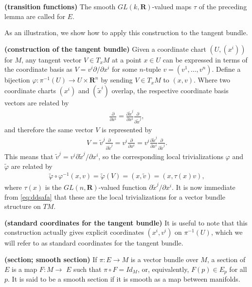 \documentclass[12pt]{article} %
\newcommand{\bfs}[1]{\textbf{({#1}) }}
\begin{document}
\begin{defa}\bfs{transition functions}
The smooth $G L(k, \mathbf{R})$-valued maps $\tau$ of the preceding lemma are called  for $E$.
\end{defa}
As an illustration, we show how to apply this construction to the tangent bundle.
\begin{cora}\bfs{construction of the tangent bundle}\label{cor:dhfdaafd}
 Given a coordinate chart $\left(U,\left(x^{i}\right)\right)$ for $M$, any tangent vector $V \in T_{x} M$ at a point $x \in U$ can be expressed in terms of the coordinate basis as $V=v^{i} \partial / \partial x^{i}$ for some $n$-tuple $v=\left(v^{1}, \ldots, v^{n}\right)$. Define a bijection $\varphi: \pi^{-1}(U) \rightarrow U \times \mathbf{R}^{n}$ by sending $V \in T_{x} M$ to $(x, v)$. Where two coordinate charts $\left(x^{i}\right)$ and $\left(\tilde{x}^{i}\right)$ overlap, the respective coordinate basis vectors are related by
\begin{align*}
\frac{\partial}{\partial x^{i}}=\frac{\partial \tilde{x}^{j}}{\partial x^{i}} \frac{\partial}{\partial \tilde{x}^{j}},
\end{align*}
and therefore the same vector $V$ is represented by
\begin{align*}
V=\tilde{v}^{j} \frac{\partial}{\partial \tilde{x}^{j}}=v^{i} \frac{\partial}{\partial x^{i}}=v^{i} \frac{\partial \tilde{x}^{j}}{\partial x^{i}} \frac{\partial}{\partial \tilde{x}^{j}} .
\end{align*}
This means that $\tilde{v}^{j}=v^{i} \partial \tilde{x}^{j} / \partial x^{i}$, so the corresponding local trivializations $\varphi$ and $\tilde{\varphi}$ are related by
\begin{align*}
\widetilde{\varphi} \circ \varphi^{-1}(x, v)=\widetilde{\varphi}(V)=(x, \tilde{v})=(x, \tau(x) v),
\end{align*}
where $\tau(x)$ is the $G L(n, \mathbf{R})$-valued function $\partial \tilde{x}^{j} / \partial x^{i}$. It is now immediate from \cref{eq:ddsafa} that these are the local trivializations for a vector bundle structure on $TM$.
\end{cora}
\begin{defa}\bfs{standard coordinates for the tangent bundle}
It is useful to note that this construction actually gives explicit coordinates $\left(x^{i}, v^{i}\right)$ on $\pi^{-1}(U)$, which we will refer to as standard coordinates for the tangent bundle.
\end{defa}
\begin{defa}\bfs{section; smooth section}
If $\pi: E \rightarrow M$ is a vector bundle over $M$, a section of $E$ is a map $F: M \rightarrow$ $E$ such that $\pi \circ F=Id_{M}$, or, equivalently, $F(p) \in E_{p}$ for all $p$. It is said to be a smooth section if it is smooth as a map between manifolds.
\end{defa}
\end{document}
